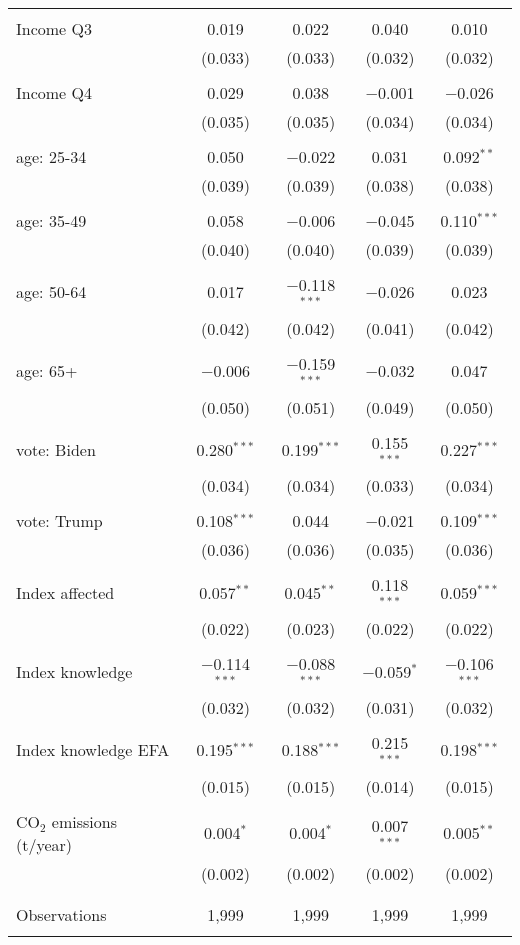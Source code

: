 \begin{tabular}{@{\extracolsep{5pt}}lcccc}
  & & & & \\ 
 Income Q3 & 0.019 & 0.022 & 0.040 & 0.010 \\ 
  & (0.033) & (0.033) & (0.032) & (0.032) \\ 
  & & & & \\ 
 Income Q4 & 0.029 & 0.038 & $-$0.001 & $-$0.026 \\ 
  & (0.035) & (0.035) & (0.034) & (0.034) \\ 
  & & & & \\ 
 age: 25-34 & 0.050 & $-$0.022 & 0.031 & 0.092$^{**}$ \\ 
  & (0.039) & (0.039) & (0.038) & (0.038) \\ 
  & & & & \\ 
 age: 35-49 & 0.058 & $-$0.006 & $-$0.045 & 0.110$^{***}$ \\ 
  & (0.040) & (0.040) & (0.039) & (0.039) \\ 
  & & & & \\ 
 age: 50-64 & 0.017 & $-$0.118$^{***}$ & $-$0.026 & 0.023 \\ 
  & (0.042) & (0.042) & (0.041) & (0.042) \\ 
  & & & & \\ 
 age: 65+ & $-$0.006 & $-$0.159$^{***}$ & $-$0.032 & 0.047 \\ 
  & (0.050) & (0.051) & (0.049) & (0.050) \\ 
  & & & & \\ 
 vote: Biden & 0.280$^{***}$ & 0.199$^{***}$ & 0.155$^{***}$ & 0.227$^{***}$ \\ 
  & (0.034) & (0.034) & (0.033) & (0.034) \\ 
  & & & & \\ 
 vote: Trump & 0.108$^{***}$ & 0.044 & $-$0.021 & 0.109$^{***}$ \\ 
  & (0.036) & (0.036) & (0.035) & (0.036) \\ 
  & & & & \\ 
 Index affected & 0.057$^{**}$ & 0.045$^{**}$ & 0.118$^{***}$ & 0.059$^{***}$ \\ 
  & (0.022) & (0.023) & (0.022) & (0.022) \\ 
  & & & & \\ 
 Index knowledge & $-$0.114$^{***}$ & $-$0.088$^{***}$ & $-$0.059$^{*}$ & $-$0.106$^{***}$ \\ 
  & (0.032) & (0.032) & (0.031) & (0.032) \\ 
  & & & & \\ 
 Index knowledge EFA & 0.195$^{***}$ & 0.188$^{***}$ & 0.215$^{***}$ & 0.198$^{***}$ \\ 
  & (0.015) & (0.015) & (0.014) & (0.015) \\ 
  & & & & \\ 
 CO$_{2}$ emissions (t/year) & 0.004$^{*}$ & 0.004$^{*}$ & 0.007$^{***}$ & 0.005$^{**}$ \\ 
  & (0.002) & (0.002) & (0.002) & (0.002) \\ 
  & & & & \\ 
\hline \\[-1.8ex] 

Observations & 1,999 & 1,999 & 1,999 & 1,999 \\ 
\hline 
\hline \\[-1.8ex] 
\end{tabular} 